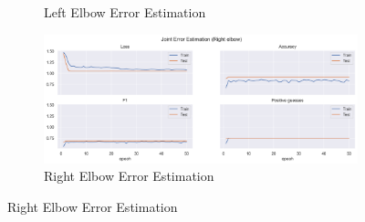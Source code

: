 \begin{figure}[!htbp]
\begin{subfigure}[b]{0.47\linewidth}
        \caption{Left Elbow Error Estimation}
        \label{fig:v2_leel_jt_ee}
    \end{subfigure}
    \hfill
    \begin{subfigure}[b]{0.47\linewidth}
        \centering
        \includegraphics[width=\textwidth]{figures/Results/v2/jt/Right elbow_ErrorEstimation.png}
        \caption{Right Elbow Error Estimation}
        \label{fig:v2_reel_jt_ee}
    \end{subfigure}
  \end{figure}
  
